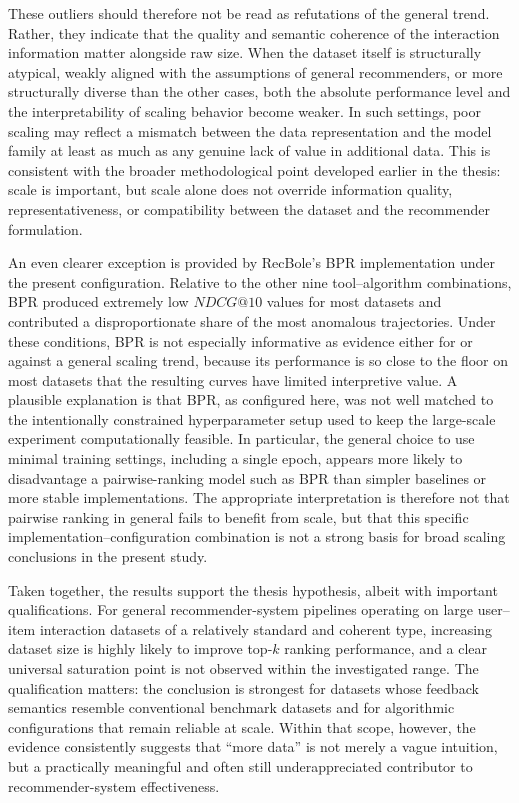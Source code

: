 \documentclass[12pt,a4paper]{article}
\begin{document}
These outliers should therefore not be read as refutations of the general trend. Rather, they indicate that the quality and semantic coherence of the interaction information matter alongside raw size. When the dataset itself is structurally atypical, weakly aligned with the assumptions of general recommenders, or more structurally diverse than the other cases, both the absolute performance level and the interpretability of scaling behavior become weaker. In such settings, poor scaling may reflect a mismatch between the data representation and the model family at least as much as any genuine lack of value in additional data. This is consistent with the broader methodological point developed earlier in the thesis: scale is important, but scale alone does not override information quality, representativeness, or compatibility between the dataset and the recommender formulation.

An even clearer exception is provided by RecBole's BPR implementation under the present configuration. Relative to the other nine tool--algorithm combinations, BPR produced extremely low $NDCG@10$ values for most datasets and contributed a disproportionate share of the most anomalous trajectories. Under these conditions, BPR is not especially informative as evidence either for or against a general scaling trend, because its performance is so close to the floor on most datasets that the resulting curves have limited interpretive value. A plausible explanation is that BPR, as configured here, was not well matched to the intentionally constrained hyperparameter setup used to keep the large-scale experiment computationally feasible. In particular, the general choice to use minimal training settings, including a single epoch, appears more likely to disadvantage a pairwise-ranking model such as BPR than simpler baselines or more stable implementations. The appropriate interpretation is therefore not that pairwise ranking in general fails to benefit from scale, but that this specific implementation--configuration combination is not a strong basis for broad scaling conclusions in the present study.

Taken together, the results support the thesis hypothesis, albeit with important qualifications. For general recommender-system pipelines operating on large user--item interaction datasets of a relatively standard and coherent type, increasing dataset size is highly likely to improve top-$k$ ranking performance, and a clear universal saturation point is not observed within the investigated range. The qualification matters: the conclusion is strongest for datasets whose feedback semantics resemble conventional benchmark datasets and for algorithmic configurations that remain reliable at scale. Within that scope, however, the evidence consistently suggests that ``more data'' is not merely a vague intuition, but a practically meaningful and often still underappreciated contributor to recommender-system effectiveness.
\end{document}
